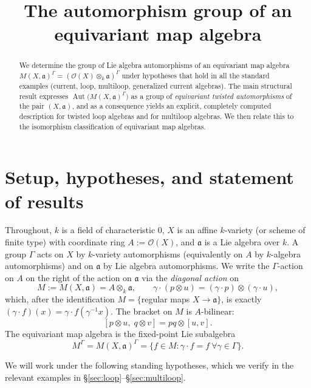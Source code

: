 \documentclass{amsart}
\theoremstyle{definition}
\DeclareMathOperator{\Aut}{Aut}
\newcommand{\fa}{\mathfrak{a}}
\newcommand{\OO}{\mathcal{O}}
\newcommand{\M}{M}
\begin{document}
\title{The automorphism group of an equivariant map algebra}
\author{}
\date{}
\maketitle

\begin{abstract}
We determine the group of Lie algebra automorphisms of an equivariant map
algebra $\M(X,\fa)^\Gamma=(\OO(X)\otimes_k\fa)^\Gamma$ under hypotheses that
hold in all the standard examples (current, loop, multiloop, generalized
current algebras).  The main structural result expresses
$\Aut\bigl(\M(X,\fa)^\Gamma\bigr)$ as a group of \emph{equivariant
twisted automorphisms} of the pair $(X,\fa)$, and as a consequence yields
an explicit, completely computed description for twisted loop algebras and
for multiloop algebras.  We then relate this to the isomorphism
classification of equivariant map algebras.
\end{abstract}

\section{Setup, hypotheses, and statement of results}\label{sec:setup}

Throughout, $k$ is a field of characteristic $0$, $X$ is an affine
$k$-variety (or scheme of finite type) with coordinate ring $A:=\OO(X)$,
and $\fa$ is a Lie algebra over $k$.  A group $\Gamma$ acts on $X$ by
$k$-variety automorphisms (equivalently on $A$ by $k$-algebra
automorphisms) and on $\fa$ by Lie algebra automorphisms.  We write the
$\Gamma$-action on $A$ on the right of the action on $\fa$ via the
\emph{diagonal action} on
\[
\M:=\M(X,\fa)=A\otimes_k\fa ,\qquad
\gamma\cdot(p\otimes u)=(\gamma\cdot p)\otimes(\gamma\cdot u),
\]
which, after the identification $\M=\{$regular maps $X\to\fa\}$, is exactly
$(\gamma\cdot f)(x)=\gamma\cdot f(\gamma^{-1}x)$.  The bracket on $\M$ is
$A$-bilinear:
\[
[p\otimes u,\;q\otimes v]=pq\otimes[u,v].
\]
The equivariant map algebra is the fixed-point Lie subalgebra
\[
\M^\Gamma=\M(X,\fa)^\Gamma=\{f\in\M:\gamma\cdot f=f\ \forall\gamma\in\Gamma\}.
\]

We will work under the following standing hypotheses, which we verify in
the relevant examples in \S\ref{sec:loop}--\S\ref{sec:multiloop}.
\end{document}
